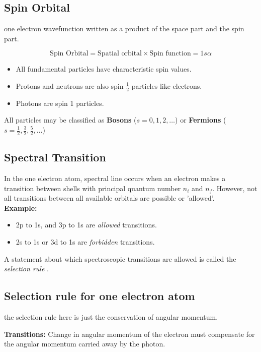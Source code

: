 \documentclass[12pt]{article}
\theoremstyle{definition}
\theoremstyle{definition}
\begin{document}
\subsection{Spin Orbital}
one electron wavefunction written as a product of the space part and the spin part.

\[
	\textrm{Spin Orbital} = \textrm{Spatial orbital} \times \textrm{Spin function} = 1 s \alpha
\]

\begin{itemize}
	\item All fundamental particles have characteristic spin values.
	\item Protons and neutrons are also spin $\frac{1}{2}$ particles like electrons.
	\item Photons are spin 1 particles.
\end{itemize}

All particles may be classified as \textbf{Bosons} ($s = 0, 1, 2, \dots$) or \textbf{Fermions} ($s = \frac{1}{2}, \frac{3}{2}, \frac{5}{2}, \dots$) 

\subsection{Spectral Transition}

In the one electron atom, spectral line occurs when an electron makes a transition between shells with principal quantum number $n_i$ and $n_f$. However, not all transitions between all available orbitals are possible or 'allowed'.\\

\textbf{Example:}  
\begin{itemize}
	\item 2p to 1s, and 3p to 1s are \textit{allowed} transitions.
	\item 2s to 1s or 3d to 1s are \textit{forbidden} transitions.
\end{itemize}

A statement about which spectroscopic transitions are allowed is called the \textit{selection rule} .

\subsection{Selection rule for one electron atom}

the selection rule here is just the conservation of angular momentum.

\textbf{Transitions:} Change in angular momentum of the electron must compensate for the angular momentum carried away by the photon. 
\end{document}

